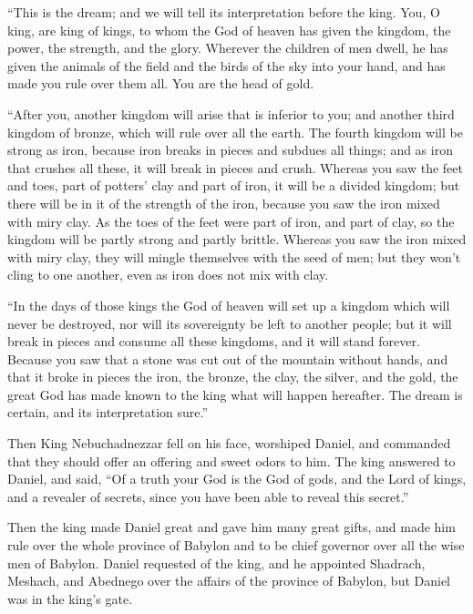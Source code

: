  ``This is the dream; and we will tell its interpretation
before the king.  You, O king, are king of kings, to whom
the God of heaven has given the kingdom, the power, the strength, and
the glory.  Wherever the children of men dwell, he has
given the animals of the field and the birds of the sky into your hand,
and has made you rule over them all. You are the head of gold.

 ``After you, another kingdom will arise that is inferior
to you; and another third kingdom of bronze, which will rule over all
the earth.  The fourth kingdom will be strong as iron,
because iron breaks in pieces and subdues all things; and as iron that
crushes all these, it will break in pieces and crush. 
Whereas you saw the feet and toes, part of potters' clay and part of
iron, it will be a divided kingdom; but there will be in it of the
strength of the iron, because you saw the iron mixed with miry clay.
 As the toes of the feet were part of iron, and part of
clay, so the kingdom will be partly strong and partly brittle.
 Whereas you saw the iron mixed with miry clay, they will
mingle themselves with the seed of men; but they won't cling to one
another, even as iron does not mix with clay.

 ``In the days of those kings the God of heaven will set
up a kingdom which will never be destroyed, nor will its sovereignty be
left to another people; but it will break in pieces and consume all
these kingdoms, and it will stand forever.  Because you
saw that a stone was cut out of the mountain without hands, and that it
broke in pieces the iron, the bronze, the clay, the silver, and the
gold, the great God has made known to the king what will happen
hereafter. The dream is certain, and its interpretation sure.''

 Then King Nebuchadnezzar fell on his face, worshiped
Daniel, and commanded that they should offer an offering and sweet odors
to him.  The king answered to Daniel, and said, ``Of a
truth your God is the God of gods, and the Lord of kings, and a revealer
of secrets, since you have been able to reveal this secret.''

 Then the king made Daniel great and gave him many great
gifts, and made him rule over the whole province of Babylon and to be
chief governor over all the wise men of Babylon.  Daniel
requested of the king, and he appointed Shadrach, Meshach, and Abednego
over the affairs of the province of Babylon, but Daniel was in the
king's gate.

